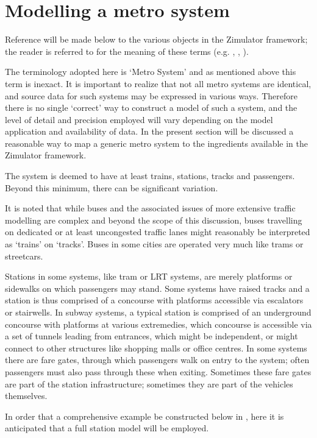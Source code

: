 \section{Modelling a metro system}
\label{metsys}

Reference will be made below to the various objects in the Zimulator
framework; the reader is referred to  for
the meaning of these terms (e.g. , , ).

The terminology adopted here is `Metro System' and as mentioned above
this term is inexact. It is important to realize that not all metro
systems are identical, and source data for such systems may be
expressed in various ways. Therefore there is no single `correct' way
to construct a model of such a system, and the level of detail and precision
employed will vary depending on the model application and availability
of data.  In the present section will be discussed a reasonable way to
map a generic metro system to the ingredients available in the
Zimulator framework.

The system is deemed to have at least trains, stations, tracks and
passengers.  Beyond this minimum, there can be significant variation.

It is noted that while buses and the associated issues of more
extensive traffic modelling are complex and beyond the scope of this
discussion, buses travelling on dedicated or at least uncongested
traffic lanes might reasonably be interpreted as `trains' on
`tracks'. Buses in some cities are operated very much like trams or
streetcars.

Stations in some systems, like tram or LRT systems, are merely
platforms or sidewalks on which passengers may stand.  Some systems
have raised tracks and a station is thus comprised of a concourse with
platforms accessible via escalators or stairwells.  In subway systems,
a typical station is comprised of an underground concourse with
platforms at various extremedies, which concourse is accessible via a
set of tunnels leading from entrances, which might be independent, or
might connect to other structures like shopping malls or office
centres.  In some systems there are fare gates, through which
passengers walk on entry to the system; often passengers must also
pass through these when exiting. Sometimes these fare gates are part
of the station infrastructure; sometimes they are part of the vehicles
themselves.

In order that a comprehensive example be constructed below in ,
here it is anticipated that a full station model will be employed.

